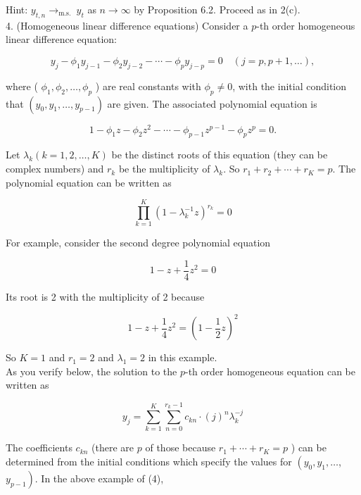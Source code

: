 \documentclass[10pt]{article}
\begin{document}
Hint: $y_{t, n} \rightarrow_{\text {m.s. }} y_{t}$ as $n \rightarrow \infty$ by Proposition 6.2. Proceed as in 2(c).\\
4. (Homogeneous linear difference equations) Consider a $p$-th order homogeneous linear difference equation:


\begin{equation*}
y_{j}-\phi_{1} y_{j-1}-\phi_{2} y_{j-2}-\cdots-\phi_{p} y_{j-p}=0 \quad(j=p, p+1, \ldots), \tag{1}
\end{equation*}


where ( $\phi_{1}, \phi_{2}, \ldots, \phi_{p}$ ) are real constants with $\phi_{p} \neq 0$, with the initial condition that $\left(y_{0}, y_{1}, \ldots, y_{p-1}\right)$ are given. The associated polynomial equation is


\begin{equation*}
1-\phi_{1} z-\phi_{2} z^{2}-\cdots-\phi_{p-1} z^{p-1}-\phi_{p} z^{p}=0 . \tag{2}
\end{equation*}


Let $\lambda_{k}(k=1,2, \ldots, K)$ be the distinct roots of this equation (they can be complex numbers) and $r_{k}$ be the multiplicity of $\lambda_{k}$. So $r_{1}+r_{2}+\cdots+r_{K}=p$. The polynomial equation can be written as


\begin{equation*}
\prod_{k=1}^{K}\left(1-\lambda_{k}^{-1} z\right)^{r_{k}}=0 \tag{3}
\end{equation*}


For example, consider the second degree polynomial equation


\begin{equation*}
1-z+\frac{1}{4} z^{2}=0 \tag{4}
\end{equation*}


Its root is 2 with the multiplicity of 2 because

$$
1-z+\frac{1}{4} z^{2}=\left(1-\frac{1}{2} z\right)^{2}
$$

So $K=1$ and $r_{1}=2$ and $\lambda_{1}=2$ in this example.\\
As you verify below, the solution to the $p$-th order homogeneous equation can be written as


\begin{equation*}
y_{j}=\sum_{k=1}^{K} \sum_{n=0}^{r_{k}-1} c_{k n} \cdot(j)^{n} \lambda_{k}^{-j} \tag{5}
\end{equation*}


The coefficients $c_{k n}$ (there are $p$ of those because $r_{1}+\cdots+r_{K}=p$ ) can be determined from the initial conditions which specify the values for $\left(y_{0}, y_{1}, \ldots\right.$, $\left.y_{p-1}\right)$. In the above example of (4),
\end{document}
